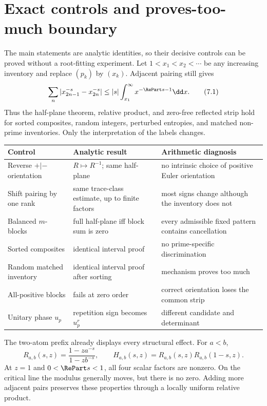 \section{Exact controls and proves-too-much boundary}
\label{sec:controls}

The main statements are analytic identities, so their decisive controls can be
proved without a root-fitting experiment.  Let $1<x_1<x_2<\cdots$ be any
increasing inventory and replace $(p_k)$ by $(x_k)$.  Adjacent pairing still
gives
\[
 \sum_n|x_{2n-1}^{-s}-x_{2n}^{-s}|
 \le |s|\int_{x_1}^{\infty}x^{-\RePart s-1}\dd x.                  \tag{7.1}
\]
Thus the half-plane theorem, relative product, and zero-free reflected strip
hold for sorted composites, random integers, perturbed entropies, and matched
non-prime inventories.  Only the interpretation of the labels changes.

\begin{center}\small
\begin{tabularx}{0.98\textwidth}{L{0.24\textwidth}L{0.24\textwidth}X}
\toprule
Control & Analytic result & Arithmetic diagnosis\\\midrule
Reverse $+|-$ orientation & $R\mapsto R^{-1}$; same half-plane & no intrinsic choice of positive Euler orientation\\
Shift pairing by one rank & same trace-class estimate, up to finite factors & most signs change although the inventory does not\\
Balanced $m$-blocks & full half-plane iff block sum is zero & every admissible fixed pattern contains cancellation\\
Sorted composites & identical interval proof & no prime-specific discrimination\\
Random matched inventory & identical interval proof after sorting & mechanism proves too much\\
All-positive blocks & fails at zero order & correct orientation loses the common strip\\
Unitary phase $u_p$ & repetition sign becomes $u_p^r$ & different candidate and determinant\\
\bottomrule
\end{tabularx}
\end{center}

The two-atom prefix already displays every structural effect.  For $a<b$,
\[
 R_{a,b}(s,z)=\frac{1-za^{-s}}{1-zb^{-s}},
 \qquad
 H_{a,b}(s,z)=R_{a,b}(s,z)R_{a,b}(1-s,z).       \tag{7.2}
\]
At $z=1$ and $0<\RePart s<1$, all four scalar factors are nonzero.  On the
critical line the modulus generally moves, but there is no zero.  Adding more
adjacent pairs preserves these properties through a locally uniform relative
product.

